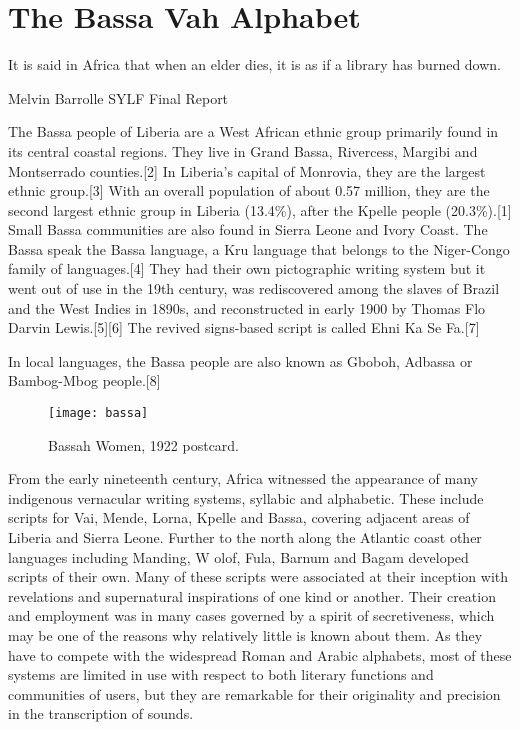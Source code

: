        
\newfontfamily{}
\newfontfamily{}

\chapter{The Bassa Vah Alphabet}

\epigraph{It is said in Africa that when an elder dies, it is as if a library has burned down. }{Melvin Barrolle SYLF Final Report}

The Bassa people of Liberia are a West African ethnic group primarily found in its central coastal regions. They live in Grand Bassa, Rivercess, Margibi and Montserrado counties.[2] In Liberia's capital of Monrovia, they are the largest ethnic group.[3] With an overall population of about 0.57 million, they are the second largest ethnic group in Liberia (13.4\%), after the Kpelle people (20.3\%).[1] Small Bassa communities are also found in Sierra Leone and Ivory Coast.
The Bassa speak the Bassa language, a Kru language that belongs to the Niger-Congo family of languages.[4] They had their own pictographic writing system but it went out of use in the 19th century, was rediscovered among the slaves of Brazil and the West Indies in 1890s, and reconstructed in early 1900 by Thomas Flo Darvin Lewis.[5][6] The revived signs-based script is called Ehni Ka Se Fa.[7]

In local languages, the Bassa people are also known as Gboboh, Adbassa or Bambog-Mbog people.[8]

\begin{figure}[htbp]
\parindent=0pt

\texttt{[image: bassa]}

\caption{Bassah Women, 1922 postcard.}
\end{figure}


From the early nineteenth century, Africa witnessed the appearance
of many indigenous vernacular writing systems, syllabic and alphabetic.
These include scripts for Vai, Mende, Lorna, Kpelle and Bassa, covering
adjacent areas of Liberia and Sierra Leone. Further to the north along the Atlantic
coast other languages including Manding, W olof, Fula, Barnum and Bagam
developed scripts of their own. Many of these scripts were associated at their
inception with revelations and supernatural inspirations of one kind or another.
Their creation and employment was in many cases governed by a spirit of secretiveness,
which may be one of the reasons why relatively little is known about
them. As they have to compete with the widespread Roman and Arabic alphabets,
most of these systems are limited in use with respect to both literary functions
and communities of users, but they are remarkable for their originality and precision
in the transcription of sounds.



